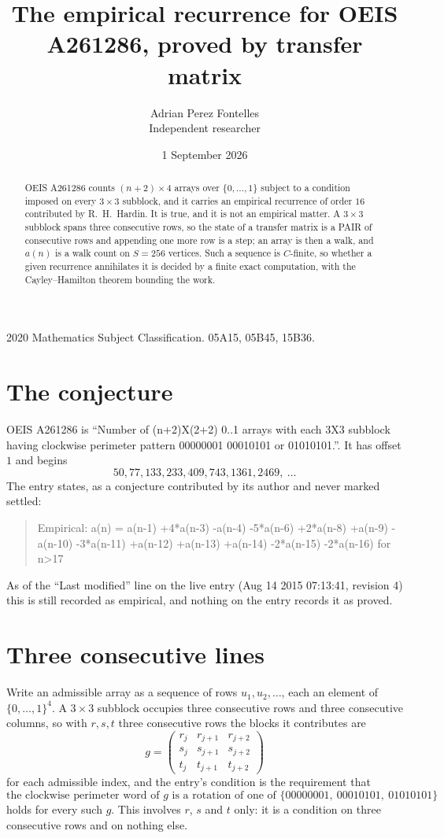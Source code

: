\documentclass[11pt,a4paper]{article}
\title{The empirical recurrence for OEIS A261286, proved by transfer matrix}
\author{Adrian Perez Fontelles\\ \small Independent researcher}
\date{1 September 2026}
\theoremstyle{plain}
\theoremstyle{definition}
\begin{document}
\maketitle

\begin{abstract}
OEIS A261286 counts $(n+2)\times4$ arrays over $\{0,\dots,1\}$ subject to a condition imposed on
every $3\times3$ subblock, and it carries an empirical recurrence of order $16$
contributed by R.~H.~Hardin. It is true, and it is not an empirical matter. A $3\times3$
subblock spans three consecutive rows, so the state of a transfer matrix is a PAIR of
consecutive rows and appending one more row is a step; an array is then a walk, and
$a(n)$ is a walk count on $S=256$ vertices. Such a sequence is $C$-finite, so whether a given
recurrence annihilates it is decided by a finite exact computation, with the Cayley--Hamilton
theorem bounding the work.
\end{abstract}

\noindent\small 2020 Mathematics Subject Classification. 05A15, 05B45, 15B36.\normalsize

\section{The conjecture}

OEIS A261286 is ``Number of (n+2)X(2+2) 0..1 arrays with each 3X3 subblock having clockwise perimeter pattern 00000001 00010101 or 01010101.''. It has offset $1$ and begins
\[
50, 77, 133, 233, 409, 743, 1361, 2469,\ \dots
\]
The entry states, as a conjecture contributed by its author and never marked settled:
\begin{quote}
Empirical: a(n) = a(n-1) +4*a(n-3) -a(n-4) -5*a(n-6) +2*a(n-8) +a(n-9) -a(n-10) -3*a(n-11) +a(n-12) +a(n-13) +a(n-14) -2*a(n-15) -2*a(n-16) for n>17
\end{quote}
As of the ``Last modified'' line on the live entry (Aug 14 2015 07:13:41, revision 4) this is still
recorded as empirical, and nothing on the entry records it as proved.

\section{Three consecutive lines}

Write an admissible array as a sequence of rows $u_1,u_2,\dots$, each an element of
$\{0,\dots,1\}^{4}$. A $3\times3$ subblock occupies three consecutive rows and
three consecutive columns, so with $r,s,t$ three consecutive rows the blocks it
contributes are
\[
g=\begin{pmatrix}r_j&r_{j+1}&r_{j+2}\\ s_j&s_{j+1}&s_{j+2}\\ t_j&t_{j+1}&t_{j+2}\end{pmatrix}
\]
for each admissible index, and the entry's condition is the requirement that
\[
\text{the clockwise perimeter word of }g\text{ is a rotation of one of }\{00000001,\ 00010101,\ 01010101\}
\]
holds for every such $g$. This involves $r$, $s$ and $t$ only: it is a condition on
three consecutive rows and on nothing else.
\end{document}
